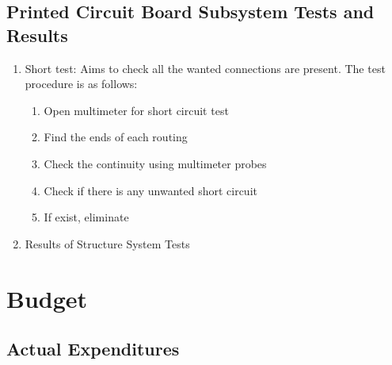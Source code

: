 \documentclass[a4paper,12pt]{article}
\begin{document}



\subsection {Printed Circuit Board Subsystem Tests and Results}


\begin{enumerate}

\item Short test: Aims to check all the wanted connections are present. The test procedure is as follows:

\begin{enumerate} 

\item Open multimeter for short circuit test  

\item Find the ends of each routing 

\item Check the continuity using multimeter probes

\item Check if there is any unwanted short circuit

\item If exist, eliminate

\end{enumerate}



\item{Results of Structure System Tests}

\end{enumerate}



\section{Budget}

	\subsection{Actual Expenditures}
		
\end{document}

